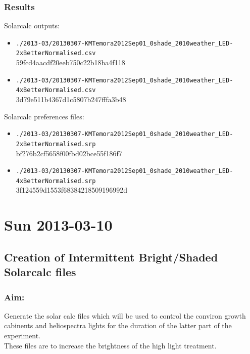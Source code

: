 \documentclass[12pt,a4paper]{book}
\begin{document}
    \subsection*{Results}
      Solarcalc outputs:
      \begin{itemize} \itemsep1pt \parskip0pt 
          \item \verb+./2013-03/20130307-KMTemora2012Sep01_0shade_2010weather_LED-2xBetterNormalised.csv+\\
            59fcd4aacdf20eeb750c22b18ba4f118
          \item \verb+./2013-03/20130307-KMTemora2012Sep01_0shade_2010weather_LED-4xBetterNormalised.csv+\\
            3d79e511b4367d1c5807b247fffa3b48
      \end{itemize}
      Solarcalc preferences files:
      \begin{itemize} \itemsep1pt \parskip0pt 
          \item \verb+./2013-03/20130307-KMTemora2012Sep01_0shade_2010weather_LED-2xBetterNormalised.srp+\\
            bf276b2cf5658f00fbd02bce55f186f7
          \item \verb+./2013-03/20130307-KMTemora2012Sep01_0shade_2010weather_LED-4xBetterNormalised.srp+\\
            3f124559d1553f68384218509196992d
      \end{itemize}

\chapter*{Sun 2013-03-10}
  \section*{Creation of Intermittent Bright/Shaded Solarcalc files}
    \subsection*{Aim:}
      Generate the solar calc files which will be used to control the conviron growth cabinents and
      heliospectra lights for the duration of the latter part of the experiment.\\
      These files are to increase the brightness of the high light treatment.\\
\end{document}
